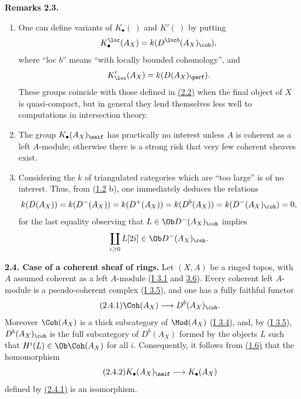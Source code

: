 \textbf{Remarks 2.3.}
\begin{enumerate}[label=\alph*)]
\item One can define variants of \(K_{\bullet}(\ )\) and \(K'(\ )\) by putting
\[
 K_{\bullet}^{\loc}(A_X)=k(D^{\loc b}(A_X)_{\coh}),
\]
where ``loc \(b\)'' means ``with locally bounded cohomology'', and
\[
 K_{\loc}'(A_X)=k(D(A_X)_{\parf}).
\]
These groups coincide with those defined in \hyperlink{sga6.e04.def.2-2}{(2.2)} when the final object of \(X\) is quasi-compact, but in general they lend themselves less well to computations in intersection theory.
\item The group \(K_{\bullet}(A_X)_{\naif}\) has practically no interest unless \(A\) is coherent as a left \(A\)-module; otherwise there is a strong risk that very few coherent sheaves exist.
\item Considering the \(k\) of triangulated categories which are ``too large'' is of no interest. Thus, from (\hyperlink{sga6.e04.lem.1-2}{1.2} b), one immediately deduces the relations
\[
 k(D(A_X))=
 k(D^-(A_X))=
 k(D^+(A_X))=
 k(D^b(A_X))=
 k(D^-(A_X)_{\coh})=0,
\]
for the last equality observing that \(L\in\Ob D^-(A_X)_{\coh}\) implies
\[
 \coprod_{i\geq0}L[2i]\in\Ob D^-(A_X)_{\coh}.
\]
\end{enumerate}

\textbf{2.4. Case of a coherent sheaf of rings.} Let \((X,A)\) be a ringed topos, with \(A\) assumed coherent as a left \(A\)-module (\hyperlink{sga6.e01.def.3-1}{I 3.1} and \hyperlink{sga6.e01.ex.3-6}{3.6}). Every coherent left \(A\)-module is a pseudo-coherent complex (\hyperlink{sga6.e01.cor.3-5}{I 3.5}), and one has a fully faithful functor
\begin{equation}\tag{2.4.1}
 \Coh(A_X)\longrightarrow D^b(A_X)_{\coh}.
\end{equation}
Moreover \(\Coh(A_X)\) is a thick subcategory of \(\Mod(A_X)\) (\hyperlink{sga6.e01.cor.3-4}{I 3.4}), and, by (\hyperlink{sga6.e01.cor.3-5}{I 3.5}), \(D^b(A_X)_{\coh}\) is the full subcategory of \(D^b(A_X)\) formed by the objects \(L\) such that \(H^i(L)\in\Ob\Coh(A_X)\) for all \(i\). Consequently, it follows from \hyperlink{sga6.e04.lem.1-6}{(1.6)} that the homomorphism
\begin{equation}\tag{2.4.2}
 K_{\bullet}(A_X)_{\naif}\longrightarrow K_{\bullet}(A_X)
\end{equation}
defined by \hyperlink{sga6.e04.eq.2-4-1}{(2.4.1)} is an isomorphism.

